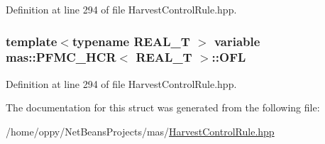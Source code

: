 Definition at line 294 of file Harvest\-Control\-Rule.\-hpp.

\hypertarget{structmas_1_1_p_f_m_c___h_c_r_a5f4d1fefb9913ab7baa38590c80efa83}{
\subsubsection[{O\-F\-L}]{\setlength{\rightskip}{0pt plus 5cm}template$<$typename R\-E\-A\-L\-\_\-\-T $>$ {\bf variable} {\bf mas\-::\-P\-F\-M\-C\-\_\-\-H\-C\-R}$<$ R\-E\-A\-L\-\_\-\-T $>$\-::O\-F\-L}}\label{structmas_1_1_p_f_m_c___h_c_r_a5f4d1fefb9913ab7baa38590c80efa83}


Definition at line 294 of file Harvest\-Control\-Rule.\-hpp.



The documentation for this struct was generated from the following file\-:\begin{DoxyCompactItemize}
\item 
/home/oppy/\-Net\-Beans\-Projects/mas/\hyperlink{_harvest_control_rule_8hpp}{Harvest\-Control\-Rule.\-hpp}\end{DoxyCompactItemize}
